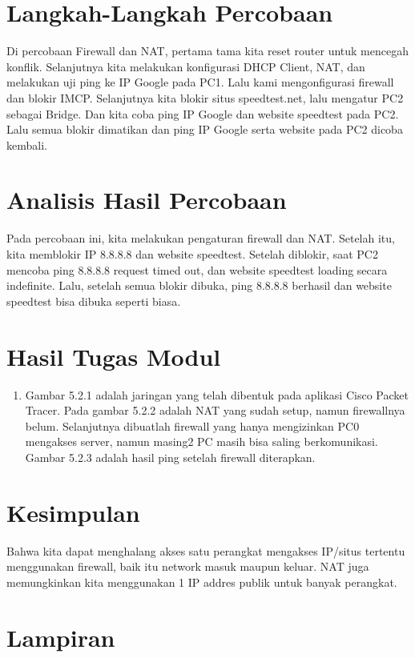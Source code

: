 \section{Langkah-Langkah Percobaan}
Di percobaan Firewall dan NAT, pertama tama kita reset router untuk mencegah konflik. Selanjutnya kita melakukan konfigurasi DHCP Client, NAT, dan melakukan uji ping ke IP Google pada PC1. Lalu kami mengonfigurasi firewall dan blokir IMCP. Selanjutnya kita blokir situs speedtest.net, lalu mengatur PC2 sebagai Bridge. Dan kita coba ping IP Google dan website speedtest pada PC2. Lalu semua blokir dimatikan dan ping IP Google serta website pada PC2 dicoba kembali.

\section{Analisis Hasil Percobaan}
Pada percobaan ini, kita melakukan pengaturan firewall dan NAT. Setelah itu, kita memblokir IP 8.8.8.8 dan website speedtest. Setelah diblokir, saat PC2 mencoba ping 8.8.8.8 request timed out, dan website speedtest loading secara indefinite. Lalu, setelah semua blokir dibuka, ping 8.8.8.8 berhasil dan website speedtest bisa dibuka seperti biasa.

\section{Hasil Tugas Modul}
\begin{enumerate}
	\item Gambar 5.2.1 adalah jaringan yang telah dibentuk pada aplikasi Cisco Packet Tracer. Pada gambar 5.2.2 adalah NAT yang sudah setup, namun firewallnya belum. Selanjutnya dibuatlah firewall yang hanya mengizinkan PC0 mengakses server, namun masing2 PC masih bisa saling berkomunikasi. Gambar 5.2.3 adalah hasil ping setelah firewall diterapkan.
\end{enumerate}

\section{Kesimpulan}
Bahwa kita dapat menghalang akses satu perangkat mengakses IP/situs tertentu menggunakan firewall, baik itu network masuk maupun keluar. NAT juga memungkinkan kita menggunakan 1 IP addres publik untuk banyak perangkat.

\section{Lampiran}
